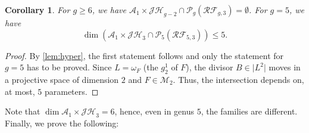 \documentclass[preprint,12pt]{amsart}
\def\cA{\ensuremath{\mathcal{A}}}
\def\cM{\ensuremath{\mathcal{M}}}
\def\cP{\ensuremath{\mathcal{P}}}
\theoremstyle{plain}
\newtheorem{corollary}[corollary]{Corollary}
\theoremstyle{definition}
\begin{document}
\begin{corollary}
 For $g\ge 6$, we have $\cA_1 \times \mathcal {JH}_{g-2} \cap \cP_g(\mathcal {RF}_{g,3}) = \emptyset$.
 For $g=5$, we have 
 \[
 \dim \left(\cA_1 \times \mathcal {JH}_{3} \cap \cP_5(\mathcal {RF}_{5,3})\right)\le 5.
 \]
 \end{corollary}
\begin{proof}
By \autoref{lem:hyper}, the first statement follows and only the statement for $g=5$ has to be proved.
Since $L=\omega_F$ (the $g^1_2$ of $F$), the divisor $B\in \vert L^2\vert$ moves in a projective space of dimension $2$ and $F\in \cM_2$.
Thus, the intersection depends on, at most, $5$ parameters.
\end{proof}

Note that $\dim \cA_1 \times \mathcal {JH}_{3}=6$, hence, even in genus $5$, the families are different.
Finally, we prove the following:
\end{document}
